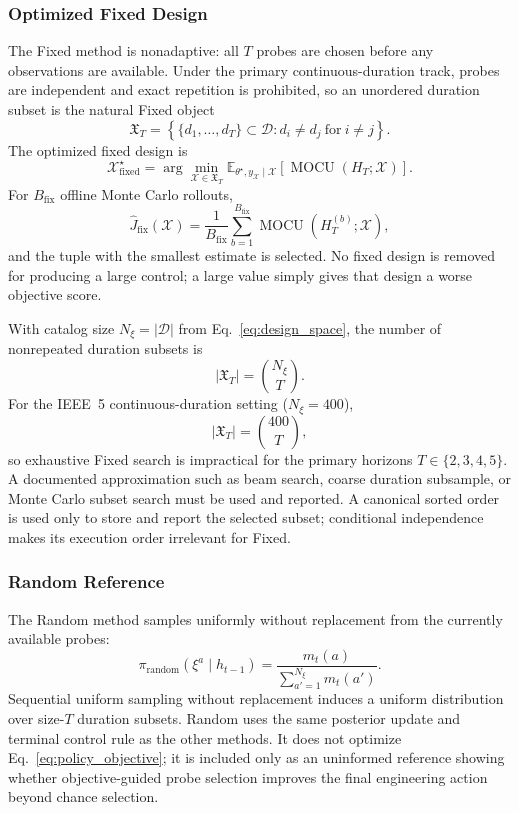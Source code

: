 \documentclass[11pt]{article}
\begin{document}
\subsubsection{Optimized Fixed Design}

The Fixed method is nonadaptive: all \(T\) probes are chosen before any
observations are available. Under the primary continuous-duration track,
probes are independent and exact repetition is prohibited, so an unordered
duration subset is the natural Fixed object
\[
\mathfrak X_T
=
\left\{
\{d_1,\ldots,d_T\}\subset\mathcal D:
d_i\ne d_j\ \text{for}\ i\ne j
\right\}.
\]
The optimized fixed design is
\[
\boxed{
\mathcal X_{\mathrm{fixed}}^{\star}
=
\arg\min_{\mathcal X\in\mathfrak X_T}
\mathbb E_{\theta^\star,y_{\mathcal X}\mid\mathcal X}
\left[
\operatorname{MOCU}(H_T;\mathcal X)
\right].
}
\label{eq:fixed_objective}
\]
For \(B_{\mathrm{fix}}\) offline Monte Carlo rollouts,
\[
\widehat J_{\mathrm{fix}}(\mathcal X)
=
\frac{1}{B_{\mathrm{fix}}}
\sum_{b=1}^{B_{\mathrm{fix}}}
\operatorname{MOCU}\!\left(H_T^{(b)};\mathcal X\right),
\]
and the tuple with the smallest estimate is selected. No fixed design is removed for producing a large control; a large value simply gives that design a worse objective score.

With catalog size \(N_\xi=|\mathcal D|\) from Eq.~\eqref{eq:design_space},
the number of nonrepeated duration subsets is
\[
\boxed{
|\mathfrak X_T|
=
\binom{N_\xi}{T}.
}
\label{eq:fixed_space_size}
\]
For the IEEE~5 continuous-duration setting (\(N_\xi=400\)),
\[
|\mathfrak X_T|
=
\binom{400}{T},
\]
so exhaustive Fixed search is impractical for the primary horizons
\(T\in\{2,3,4,5\}\). A documented approximation such as beam search, coarse
duration subsample, or Monte Carlo subset search must be used and reported.
A canonical sorted order is used only to store and report the selected subset;
conditional independence makes its execution order irrelevant for Fixed.

\subsubsection{Random Reference}

The Random method samples uniformly without replacement from the currently available probes:
\[
\boxed{
\pi_{\mathrm{random}}(\xi^a\mid h_{t-1})
=
\frac{m_t(a)}{
\sum_{a'=1}^{N_\xi}m_t(a')
}.
}
\label{eq:random_policy}
\]
Sequential uniform sampling without replacement induces a uniform distribution
over size-\(T\) duration subsets.
Random uses the same posterior update and terminal control rule as the other methods. It does not optimize Eq.~\eqref{eq:policy_objective}; it is included only as an uninformed reference showing whether objective-guided probe selection improves the final engineering action beyond chance selection.
\end{document}
